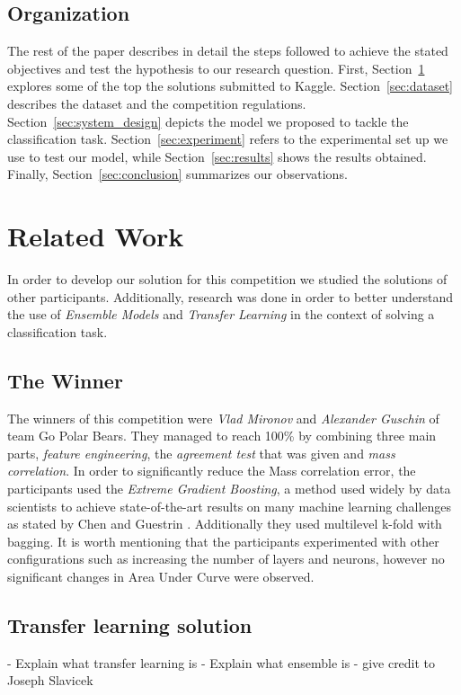 \documentclass[conference]{IEEEtran}
\begin{document}
\subsection{Organization}
The rest of the paper describes in detail the steps followed to achieve the stated objectives and test the hypothesis to our research question. First, Section~\ref{sec:related_work} explores some of the top the solutions submitted to Kaggle. Section~\ref{sec:dataset} describes the dataset and the competition regulations. Section~\ref{sec:system_design} depicts the model we proposed to tackle the classification task. Section~\ref{sec:experiment} refers to the experimental set up we use to test our model, while Section~\ref{sec:results} shows the results obtained. Finally, Section~\ref{sec:conclusion} summarizes our observations.

\section{Related Work}
\label{sec:related_work}
In order to develop our solution for this competition we studied the solutions of other participants. Additionally, research was done in order to better understand the use of \textit{Ensemble Models} and \textit{Transfer Learning} in the context of solving a classification task.

\subsection{The Winner}
The winners of this competition were \textit{Vlad Mironov} and \textit{Alexander Guschin} of team Go Polar Bears. They managed to reach 100\% by combining three main parts, \textit{feature engineering}, the \textit{agreement test} that was given and \textit{mass correlation}. In order to significantly reduce the Mass correlation error, the participants used the \textit{Extreme Gradient Boosting}, a method used widely by data scientists to achieve state-of-the-art results on many machine learning challenges as stated by Chen and Guestrin \cite{chen2016xgboost}. Additionally they used multilevel k-fold with bagging. It is worth mentioning that the participants experimented with other configurations such as increasing the number of layers and neurons, however no significant changes in Area Under Curve were observed.

\subsection{Transfer learning solution}
- Explain what transfer learning is
- Explain what ensemble is 
- give credit to Joseph Slavicek
\end{document}

